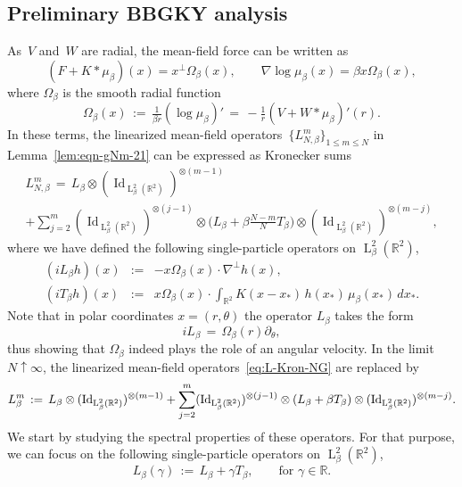 \documentclass[a4paper,11pt,reqno,noindent]{amsart}
\theoremstyle{plain}
\numberwithin{equation}{section}
\newcommand{\R}{\mathbb R}
\newcommand{\Id}{\operatorname{Id}}
\newcommand{\3}{|\!|\!|}
\newcommand{\Ld}{\operatorname{L}}
\begin{document}
\subsection{Preliminary BBGKY analysis}
As~$V$ and~$W$ are radial, the mean-field force can be written as
\begin{equation}\label{eq:non-Gauss-rad}
(F+K\ast\mu_\beta)(x)=x^\bot\Omega_\beta(x),\qquad\nabla\log\mu_\beta(x)=\beta x\Omega_\beta(x),
\end{equation}
where $\Omega_\beta$ is the smooth radial function
\[\Omega_\beta(x)\,:=\,\tfrac1{\beta r}(\log\mu_\beta)'\,=\,-\tfrac1r(V+W\ast\mu_\beta)'(r).\]
In these terms, the linearized mean-field operators~$\{L_{N,\beta}^m\}_{1\le m\le N}$ in Lemma~\ref{lem:eqn-gNm-21} can be expressed as Kronecker sums
\begin{multline}\label{eq:L-Kron-NG}
L_{N,\beta}^m\,=\,
L_\beta\otimes(\Id_{\Ld^2_\beta(\R^2)})^{\otimes(m-1)}\\
+\sum_{j=2}^m(\Id_{\Ld^2_\beta(\R^2)})^{\otimes(j-1)}\otimes \big(L_\beta+\beta\tfrac{N-m}NT_\beta\big)\otimes (\Id_{\Ld^2_\beta(\R^2)})^{\otimes(m-j)},
\end{multline}
where we have defined the following single-particle operators on $\Ld^2_\beta(\R^2)$,
\begin{eqnarray}
(iL_\beta h)(x)&:=&-x\Omega_\beta(x)\cdot\nabla^\bot h(x),\nonumber\\
(iT_\beta h)(x)&:=&x\Omega_\beta(x)\cdot\int_{\R^2}K(x-x_*)\,h(x_*)\,\mu_\beta(x_*)\,dx_*.\label{eq:Lbeta0}
\end{eqnarray}
Note that in polar coordinates $x=(r,\theta)$ the operator $L_\beta$ takes the form
\begin{equation}\label{eq:Lbeta0-polar}
iL_\beta \,=\,\Omega_\beta(r) \partial_\theta,
\end{equation}
thus showing that $\Omega_\beta$ indeed plays the role of an angular velocity.
In the limit $N\uparrow\infty$, the linearized mean-field operators~\eqref{eq:L-Kron-NG} are replaced by
\begin{equation*}
L_{\beta}^m\,:=\,
L_\beta\otimes(\Id_{\Ld^2_\beta(\R^2)})^{\otimes(m-1)}\\
+\sum_{j=2}^m(\Id_{\Ld^2_\beta(\R^2)})^{\otimes(j-1)}\otimes (L_\beta+\beta T_\beta) \otimes (\Id_{\Ld^2_\beta(\R^2)})^{\otimes(m-j)}.
\end{equation*}
We start by studying the spectral properties of these operators.
For that purpose, we can focus on the following single-particle operators on $\Ld^2_\beta(\R^2)$,
\[L_\beta(\gamma)\,:=\,L_\beta+\gamma T_\beta,\qquad\text{for $\gamma\in\R$}.\]
\end{document}
